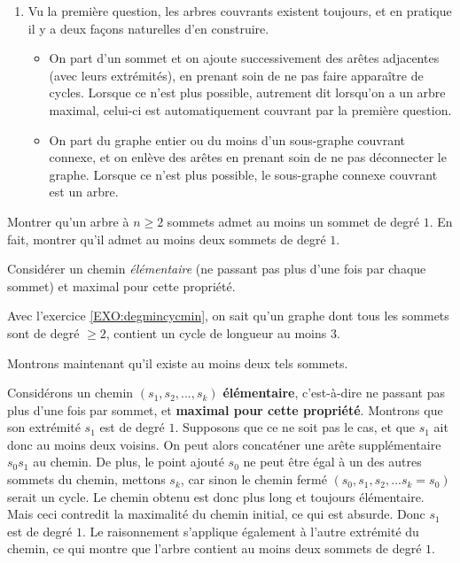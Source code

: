 \begin{exo}
\begin{sol}
\begin{enumerate}
\item Vu la première question, les arbres couvrants existent toujours, et en pratique il y a deux façons naturelles d'en construire.
\begin{itemize}
\item On part d'un sommet et on ajoute successivement des arêtes adjacentes (avec leurs extrémités), en prenant soin de ne pas faire apparaître de cycles. Lorsque ce n'est plus possible, autrement dit lorsqu'on a un arbre maximal, celui-ci est automatiquement couvrant par la première question.
\item On part du graphe entier ou du moins d'un sous-graphe couvrant connexe, et on enlève des arêtes en prenant soin de ne pas déconnecter le graphe. Lorsque ce n'est plus possible, le sous-graphe connexe couvrant est un arbre.
\end{itemize}
\end{enumerate}
\end{sol}
\end{exo}


\begin{exo}[Feuilles]
\label{EXO:arbrefeuille}
Montrer qu'un arbre à $n\geq 2$ sommets admet au moins un sommet de degré $1$. En fait, montrer qu'il admet au moins deux sommets de degré $1$.
\begin{hint}
Considérer un chemin \emph{élémentaire} (ne passant pas plus d'une fois par chaque sommet) et maximal pour cette propriété.
\end{hint}
\begin{sol}
Avec l'exercice \ref{EXO:degmincycmin}, on sait qu'un graphe dont tous les sommets sont de degré $\geq 2$, contient un cycle de longueur au moins $3$.

Montrons maintenant qu'il existe au moins deux tels sommets.

Considérons un chemin $(s_1, s_2, ..., s_k)$ \textbf{élémentaire}, c'est-à-dire ne passant pas plus d'une fois par sommet, et \textbf{maximal pour cette propriété}. Montrons que son extrémité $s_1$ est de degré $1$. Supposons que ce ne soit pas le cas, et que $s_1$ ait donc au moins deux voisins. On peut alors concaténer une arête supplémentaire $s_0s_1$ au chemin. De plus, le point ajouté $s_0$ ne peut être égal à un des autres sommets du chemin, mettons $s_k$, car sinon le chemin fermé $(s_0, s_1, s_2, ... s_k=s_0)$ serait un cycle. Le chemin obtenu est donc plus long et toujours élémentaire. Mais ceci contredit la maximalité du chemin initial, ce qui est absurde. Donc $s_1$ est de degré $1$. Le raisonnement s'applique également à l'autre extrémité du chemin, ce qui montre que l'arbre contient au moins deux sommets de degré $1$.

\end{sol}
\end{exo}

